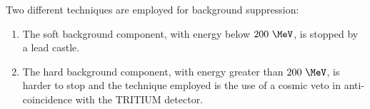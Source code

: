Two different techniques are employed for background suppression:

\begin{enumerate}

\item{}  The soft background component, with energy below $200~\MeV$, is stopped by a lead castle.

\item{} The hard background component, with energy greater than $200~\MeV$, is harder to stop and the technique employed is the use of a cosmic veto in anti-coincidence with the TRITIUM detector. 

\end{enumerate}